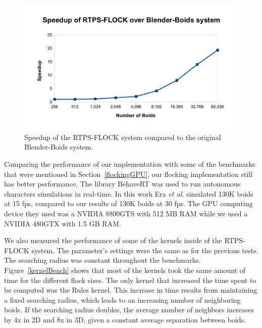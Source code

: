 \begin{figure}[htbp]
\begin{center}
\includegraphics[scale=0.7]{figures/speedup.pdf}
\caption{Speedup of the RTPS-FLOCK system compared to the original Blender-Boids system.}
\label{speedup}
\end{center}
\end{figure}

Comparing the performance of our implementation with some of the benchmarks that were mentioned in Section~\ref{flockingGPU}, our flocking implementation still has better performance. The library BehaveRT was used to run autonomous characters simulations in real-time. 
In this work Era {\em et al.\/} simulated 130K boids at 15 fps, compared to our results of 130K boids at 30 fps. The GPU computing device they used was a NVIDIA 8800GTS with 512 MB RAM while we used a NVIDIA 480GTX with 1.5 GB RAM. 

We also measured the performance of some of the kernels inside of the RTPS-FLOCK system. The parameter's settings were the same as for the previous tests. The searching radius was constant throughout the benchmarks. Figure~\ref{kernelBench} shows that most of the kernels took the same amount of time for the different flock sizes. The only kernel that increased the time spent to be computed was the Rules kernel. This increase in time results from maintaining a fixed searching radius, which leads to an increasing number of neighboring boids. If the searching radius doubles, the average number of neighbors increases by 4x in 2D and 8x in 3D, given a constant average separation between boids. 

